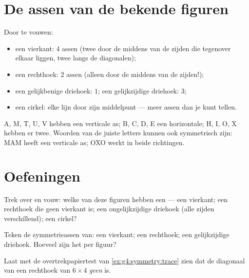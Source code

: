 \section{De assen van de bekende figuren}

\begin{example}\label{ex:g4:symmetry:shapes}
Door te vouwen:
\begin{itemize}
  \item een vierkant: $4$ assen (twee door de middens van de zijden die
        tegenover elkaar liggen, twee langs de diagonalen);
  \item een rechthoek: $2$ assen (alleen door de middens van de zijden!);
  \item een gelijkbenige driehoek: $1$; een gelijkzijdige driehoek: $3$;
  \item een cirkel: elke lijn door zijn middelpunt --- meer assen dan je
        kunt tellen.
\end{itemize}
\end{example}

\begin{example}\label{ex:g4:symmetry:letters}
A, M, T, U, V hebben een verticale as; B, C, D, E een horizontale; H, I, O,
X hebben er twee. Woorden van de juiste letters kunnen ook symmetrisch zijn:
MAM heeft een verticale as; OXO werkt in beide richtingen.
\end{example}

\section{Oefeningen}

\begin{exercise}[$\star$]\label{exo:g4:symmetry:1}
Trek over en vouw: welke van deze figuren hebben een  --- een
vierkant; een rechthoek die geen vierkant is; een ongelijkzijdige driehoek
(alle zijden verschillend); een cirkel?
\end{exercise}

\begin{exercise}[$\star$]\label{exo:g4:symmetry:2}
Teken de symmetrieassen van: een vierkant; een rechthoek; een gelijkzijdige
driehoek. Hoeveel zijn het per figuur?
\end{exercise}

\begin{exercise}[$\star$]\label{exo:g4:symmetry:3}
Laat met de overtrekpapiertest van \cref{ex:g4:symmetry:trace} zien dat de
diagonaal van een rechthoek van $6 \times 4$ \emph{geen}  is.
\end{exercise}

